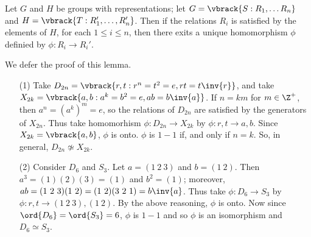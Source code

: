 \begin{lemma}\label{1.6.4}
    Let $G$ and  $H$ be groups with representations; let  $G=\vbrack{S : R_1,
    \dots R_n}$ and $H=\vbrack{T : R_1', \dots, R_n'}$. Then if the relations
    $R_i$ is satisfied by the elements of $H$, for each  $1 \leq i \leq n$, then
    there exits a unique homomorphism  $\phi$ definied by  $\phi:R_i \rightarrow
    R_i'$.
\end{lemma}
\begin{remark}
    We defer the proof of this lemma.
\end{remark}

\begin{example}
    \begin{enumerate}
        \item[(1)] Take $D_{2n}=\vbrack{r,t : r^n=t^2=e, rt=t\inv{r}}$, and take
            $X_{2k}=\vbrack{a,b : a^k=b^2=e, ab=b\inv{a}}$. If $n=km$ for  $m
            \in \Z^+$, then  $a^n=(a^k)^m=e$, so the relations of $D_{2n}$ are
            satisfied by the generators of $X_{2n}$. Thus take homomorhism
            $\phi:D_{2n} \rightarrow X_{2k}$ by $\phi:r,t \rightarrow a,b$.
            Since $X_{2k}=\vbrack{a,b}$, $\phi$ is onto.  $\phi$ is $1-1$
            if, and only if  $n=k$. So, in general, $D_{2n} \not\simeq X_{2k}$.

        \item[(2)] Consider $D_6$ and  $S_3$. Let $a=(1 \ 2 \ 3)$ and $b=(1 \
            2)$. Then $a^3=(1)(2)(3)=(1)$ and $b^2=(1)$; moreover, $ab=(1 \ 2 \
            3)(1 \ 2)=(1 \ 2)(3 \ 2 \ 1)=b\inv{a}$. Thus take $\phi:D_6
            \rightarrow S_3$ by $\phi:r,t \rightarrow (1 \ 2 \ 3), (1 \ 2)$. By
            the above reasoning,  $\phi$ is onto. Now since
            $\ord{D_6}=\ord{S_3}=6$, $\phi$ is  $1-1$ and so  $\phi$ is an
            isomorphism and  $D_6 \simeq S_3$.
    \end{enumerate}
\end{example}

